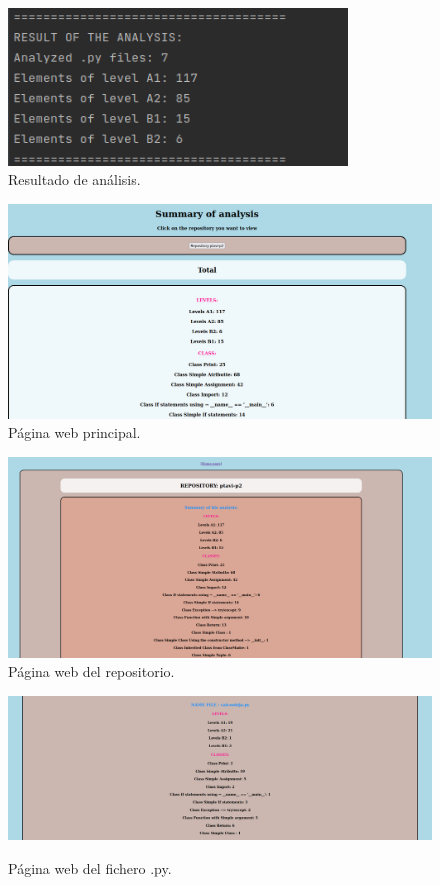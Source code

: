 \documentclass[a4paper, 12pt]{book}
\begin{document}
\begin{figure}
  \centering
  \includegraphics[width=9cm, keepaspectratio]{img/ejemplousoana2.png}
  \caption{Resultado de análisis.}\label{fig:ana2}
\end{figure}

\begin{figure}
  \centering
  \includegraphics[width=1\textwidth]{img/ejemplousoana3.png}
  \caption{Página web principal.}\label{fig:ana3}
\end{figure}

\begin{figure}
  \centering
  \includegraphics[width=1\textwidth]{img/ejemplousoana4.png}
  \caption{Página web del repositorio.}\label{fig:ana4}
\end{figure}

\begin{figure}
  \centering
  \includegraphics[width=1\textwidth]{img/ejemplousoana5.png}
  \label{fig:ana5}
  \caption{Página web del fichero .py.}
\end{figure}
\end{document}
